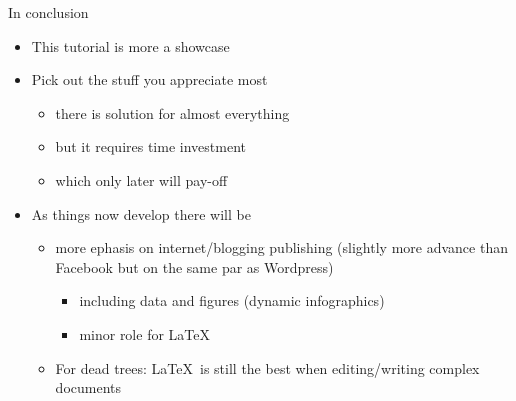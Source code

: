 \documentclass[ignorenonframetext,]{beamer}
\begin{document}
\begin{frame}{In conclusion}

\begin{itemize}
\item
  This tutorial is more a showcase
\item
  Pick out the stuff you appreciate most

  \begin{itemize}
  \itemsep1pt\parskip0pt
  \item
    there is solution for almost everything
  \item
    but it requires time investment
  \item
    which only later will pay-off
  \end{itemize}
\item
  As things now develop there will be

  \begin{itemize}
  \itemsep1pt\parskip0pt
  \item
    more ephasis on internet/blogging publishing (slightly more advance
    than Facebook but on the same par as Wordpress)

    \begin{itemize}
    \itemsep1pt\parskip0pt
    \item
      including data and figures (dynamic infographics)
    \item
      minor role for \LaTeX~
    \end{itemize}
  \item
    For dead trees: \LaTeX~is still the best when editing/writing
    complex documents
  \end{itemize}
\end{itemize}

\end{frame}
\end{document}
